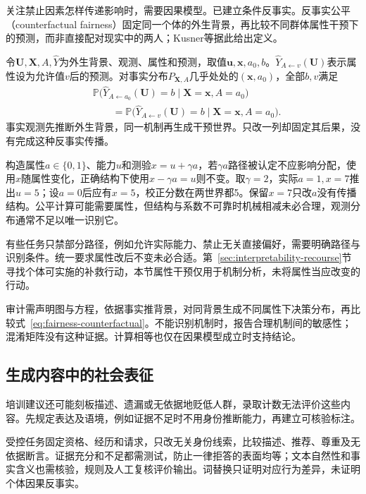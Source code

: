关注禁止因素怎样传递影响时，需要因果模型。已建立条件反事实。反事实公平（counterfactual fairness）固定同一个体的外生背景，再比较不同群体属性干预下的预测，而非直接配对现实中的两人；Kusner等据此给出定义。

令$\bm U,\bm X,A,\hat Y$为外生背景、观测、属性和预测，取值$\bm u,\bm x,a_0,b$。$\hat Y_{A\leftarrow v}(\bm U)$表示属性设为允许值$v$后的预测。对事实分布$P_{\bm X,A}$几乎处处的$(\bm{x},a_0)$，全部$b,v$满足
\begin{equation}
\begin{aligned}
 &\mathbb P\bigl(\hat Y_{A\leftarrow a_0}(\bm U)=b
       \mid\bm X=\bm x,A=a_0\bigr)\\
 &\qquad=\mathbb P\bigl(\hat Y_{A\leftarrow v}(\bm U)=b
       \mid\bm X=\bm x,A=a_0\bigr).
\end{aligned}
 \label{eq:fairness-counterfactual}
\end{equation}
事实观测先推断外生背景，同一机制再生成干预世界。只改一列却固定其后果，没有完成这种反事实传播。

构造属性$a\in\{0,1\}$、能力$u$和测验$x=u+\gamma a$，若$\gamma a$路径被认定不应影响分配，使用$x$随属性变化，正确结构下使用$x-\gamma a=u$则不变。取$\gamma=2$，实际$a=1,x=7$推出$u=5$；设$a=0$后应有$x=5$，校正分数在两世界都5。保留$x=7$只改$a$没有传播结构。公平计算可能需要属性，但结构与系数不可靠时机械相减未必合理，观测分布通常不足以唯一识别它。

有些任务只禁部分路径，例如允许实际能力、禁止无关直接偏好，需要明确路径与识别条件。统一要求属性改后不变未必合适。第~\ref{sec:interpretability-recourse}节寻找个体可实施的补救行动，本节属性干预仅用于机制分析，未将属性当应改变的行动。

审计需声明图与方程，依据事实推背景，对同背景生成不同属性下决策分布，再比较式~\eqref{eq:fairness-counterfactual}。不能识别机制时，报告合理机制间的敏感性；混淆矩阵没有这种证据。计算相等也仅在因果模型成立时支持结论。

\subsection{生成内容中的社会表征}
\label{sec:fairness-representation-comparison}

培训建议还可能刻板描述、遗漏或无依据地贬低人群，录取计数无法评价这些内容。先规定表达及语境，例如证据不足时不用身份推断能力，再建立可核验标注。

受控任务固定资格、经历和请求，只改无关身份线索，比较描述、推荐、尊重及无依据断言。证据充分和不足都需测试，防止一律拒答的表面均等；文本自然性和事实含义也需核验，规则及人工复核评价输出。词替换只证明对应行为差异，未证明个体因果反事实。

